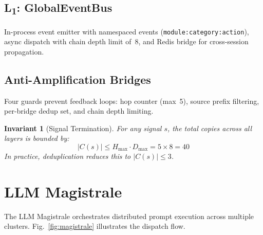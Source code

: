 \documentclass[journal,10pt]{IEEEtran}
\newcommand{\code}[1]{\texttt{#1}}
\newcommand{\layerone}{L\textsubscript{1}}
\newtheorem{invariant}{Invariant}
\begin{document}
\subsection{\layerone: GlobalEventBus}
\label{sec:l1}

In-process event emitter with namespaced events (\code{module:category:action}), async dispatch with chain depth limit of~8, and Redis bridge for cross-session propagation.

\subsection{Anti-Amplification Bridges}
\label{sec:bridges}

Four guards prevent feedback loops: hop counter (max~5), source prefix filtering, per-bridge dedup set, and chain depth limiting.

\begin{invariant}[Signal Termination]
\label{inv:termination}
For any signal $s$, the total copies across all layers is bounded by:
\begin{equation}
|C(s)| \leq H_{\max} \cdot D_{\max} = 5 \times 8 = 40
\label{eq:termination}
\end{equation}
In practice, deduplication reduces this to $|C(s)| \leq 3$.
\end{invariant}

\section{LLM Magistrale}
\label{sec:magistrale}

The LLM Magistrale orchestrates distributed prompt execution across multiple clusters. Fig.~\ref{fig:magistrale} illustrates the dispatch flow.
\end{document}
